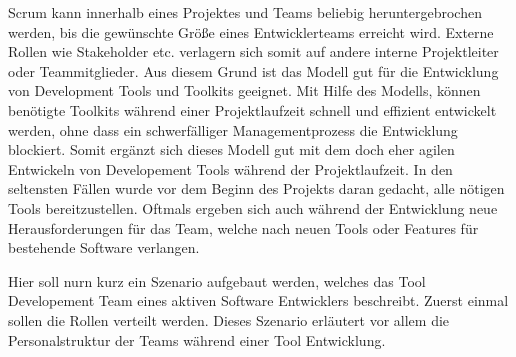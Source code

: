 \documentclass[pagesize, paper=a4, fontsize=12pt, titlepage=true, headings=small, headnosepline, abstractoff, liststotoc, nochapterprefix, plainheadsepline, twoside]{scrreprt}
\begin{document}
Scrum kann innerhalb eines Projektes und Teams beliebig heruntergebrochen werden, bis die gewünschte Größe eines Entwicklerteams erreicht wird. Externe Rollen wie Stakeholder etc. verlagern sich somit auf andere interne Projektleiter oder Teammitglieder. Aus diesem Grund ist das Modell gut für die Entwicklung von Development Tools und Toolkits geeignet. Mit Hilfe des Modells, können benötigte Toolkits während einer Projektlaufzeit schnell und effizient entwickelt werden, ohne dass ein schwerfälliger Managementprozess die Entwicklung blockiert. Somit ergänzt sich dieses Modell gut mit dem doch eher agilen Entwickeln von Developement Tools während der Projektlaufzeit. In den seltensten Fällen wurde vor dem Beginn des Projekts daran gedacht, alle nötigen Tools bereitzustellen. Oftmals ergeben sich auch während der Entwicklung neue Herausforderungen für das Team, welche nach neuen Tools oder Features für bestehende Software verlangen.

Hier soll nurn kurz ein Szenario aufgebaut werden, welches das Tool Developement Team eines aktiven Software Entwicklers beschreibt. Zuerst einmal sollen die Rollen verteilt werden. Dieses Szenario erläutert vor allem die Personalstruktur der Teams während einer Tool Entwicklung.
\end{document}

